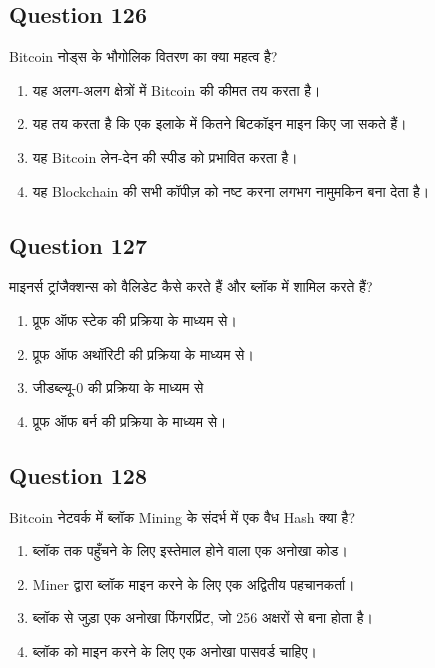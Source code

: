 \documentclass[12pt,a4paper]{article}
\begin{document}
\bigskip


\subsection*{Question 126}
Bitcoin नोड्स के भौगोलिक वितरण का क्या महत्व है?

\begin{enumerate}[label=\Alph*., leftmargin=*]
\item यह अलग-अलग क्षेत्रों में Bitcoin की कीमत तय करता है।
\item यह तय करता है कि एक इलाके में कितने बिटकॉइन माइन किए जा सकते हैं।
\item यह Bitcoin लेन-देन की स्पीड को प्रभावित करता है।
\item यह Blockchain की सभी कॉपीज़ को नष्ट करना लगभग नामुमकिन बना देता है।
\end{enumerate}

\bigskip


\subsection*{Question 127}
माइनर्स ट्रांजैक्शन्स को वैलिडेट कैसे करते हैं और ब्लॉक में शामिल करते हैं?

\begin{enumerate}[label=\Alph*., leftmargin=*]
\item प्रूफ ऑफ स्टेक की प्रक्रिया के माध्यम से।
\item प्रूफ ऑफ अथॉरिटी की प्रक्रिया के माध्यम से।
\item जीडब्ल्यू-0 की प्रक्रिया के माध्यम से
\item प्रूफ ऑफ बर्न की प्रक्रिया के माध्यम से।
\end{enumerate}

\bigskip


\subsection*{Question 128}
Bitcoin नेटवर्क में ब्लॉक Mining के संदर्भ में एक वैध Hash क्या है?

\begin{enumerate}[label=\Alph*., leftmargin=*]
\item ब्लॉक तक पहुँचने के लिए इस्तेमाल होने वाला एक अनोखा कोड।
\item Miner द्वारा ब्लॉक माइन करने के लिए एक अद्वितीय पहचानकर्ता।
\item ब्लॉक से जुड़ा एक अनोखा फिंगरप्रिंट, जो 256 अक्षरों से बना होता है।
\item ब्लॉक को माइन करने के लिए एक अनोखा पासवर्ड चाहिए।
\end{enumerate}
\end{document}
